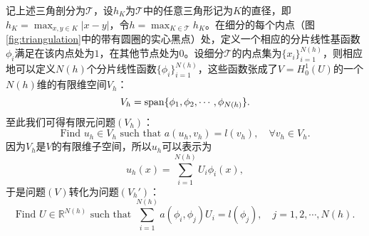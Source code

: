 \documentclass[a4paper,10pt]{ctexart}
\begin{document}
记上述三角剖分为$ \mathcal{T} $，设$ h_K $为$ \mathcal{T} $中的任意三角形记为$ K $的直径，即$ h_K = \max_{x,y\in K}|x-y| $，令$ h = \max_{K\in \mathcal{T}}h_K $。在细分的每个内点（图\ref{fig:triangulation}中的带有圆圈的实心黑点）处，定义一个相应的分片线性基函数$ \phi_i $满足在该内点处为$ 1 $，在其他节点处为$ 0 $。设细分$ \mathcal{T} $的内点集为$ \{x_i\}_{i=1}^{N(h)} $，则相应地可以定义$ N(h) $个分片线性函数$ \{\phi_i\}_{i=1}^{N(h)} $，这些函数张成了$ V=H^1_0(U) $的一个$ N(h) $维的有限维空间$ V_h $：
\begin{equation}
    V_h = {\rm span}\{\phi_1,\phi_2,\cdots ,\phi_{N(h)}\}.
\end{equation}
至此我们可得有限元问题$ (V_h) $：
\begin{equation}
    \text{Find } u_h\in V_h \text{ such that } a(u_h,v_h) = l(v_h),\quad \forall v_h\in V_h.
\end{equation}
因为$ V_h $是$ V $的有限维子空间，所以$ u_h $可以表示为
\begin{equation}
    u_h(x) = \sum_{i=1}^{N(h)} U_i\phi_i(x),
\end{equation}
于是问题$ (V) $转化为问题$ (V_h') $：
\begin{equation}
    \text{Find } U\in \mathbb{R}^{N(h)} \text{ such that } \sum_{i=1}^{N(h)} a(\phi_i,\phi_j)U_i = l(\phi_j),\quad j=1,2,\cdots ,N(h).
\end{equation}
\end{document}
